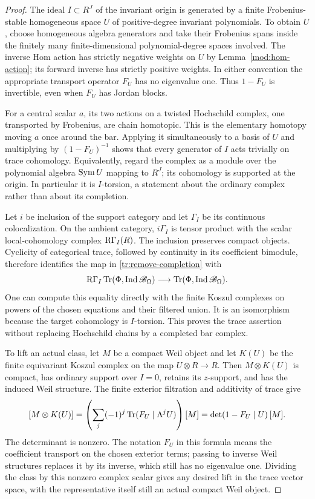 \begin{proof}
The ideal $I\subset R^J$ of the invariant origin is generated by a
finite Frobenius-stable homogeneous space $U$ of positive-degree
invariant polynomials.  To obtain $U$, choose homogeneous algebra
generators and take their Frobenius spans inside the finitely many
finite-dimensional polynomial-degree spaces involved.  The inverse
Hom action has strictly negative weights on $U$ by
Lemma~\ref{mod:hom-action}; its forward inverse has strictly positive
weights.  In either convention the appropriate transport operator
$F_U$ has no eigenvalue one.  Thus $1-F_U$ is invertible, even when
$F_U$ has Jordan blocks.

For a central scalar $a$, its two actions on a twisted Hochschild
complex, one transported by Frobenius, are chain homotopic.  This is
the elementary homotopy moving $a$ once around the bar.  Applying it
simultaneously to a basis of $U$ and multiplying by $(1-F_U)^{-1}$
shows that every generator of $I$ acts trivially on trace cohomology.
Equivalently, regard the complex as a module over the polynomial
algebra $\operatorname{Sym} U$ mapping to $R^J$; its cohomology is supported at the
origin.  In particular it is $I$-torsion, a statement about the ordinary
complex rather than about its completion.

Let $i$ be inclusion of the support category and let $\Gamma_I$ be
its continuous colocalization.  On the ambient category,
$i\Gamma_I$ is tensor product with the scalar local-cohomology complex
$\operatorname{R\Gamma}_I(R)$.  The inclusion preserves compact objects.  Cyclicity
of categorical trace, followed by continuity in its coefficient
bimodule, therefore identifies the map in
\eqref{tr:remove-completion} with
\[
 \operatorname{R\Gamma}_I\operatorname{Tr}(\Phi,\operatorname{Ind}\mathscr B_\Omega)
       \longrightarrow
 \operatorname{Tr}(\Phi,\operatorname{Ind}\mathscr B_\Omega).
\]
One can compute this equality directly with the finite Koszul
complexes on powers of the chosen equations and their filtered union.
It is an isomorphism because the target cohomology is $I$-torsion.
This proves the trace assertion without replacing Hochschild chains
by a completed bar complex.

To lift an actual class, let $M$ be a compact Weil object and let
$K(U)$ be the finite equivariant Koszul complex on the map
$U\otimes R\to R$.  Then $M\otimes K(U)$ is compact, has ordinary
support over $I=0$, retains its $z$-support, and has the induced Weil
structure.  The finite exterior filtration and additivity of trace
give
\begin{equation}\label{tr:koszul-factor}
 [M\otimes K(U)]
     =\left(\sum_j(-1)^j\operatorname{Tr}(F_U\mid\Lambda^jU)\right)[M]
     =\det(1-F_U\mid U)\,[M].
\end{equation}
The determinant is nonzero.  The notation $F_U$ in this formula means
the coefficient transport on the chosen exterior terms; passing to
inverse Weil structures replaces it by its inverse, which still has
no eigenvalue one.  Dividing the class by this nonzero complex scalar
gives any desired lift in the trace vector space, with the representative
itself still an actual compact Weil object.


\end{proof}

